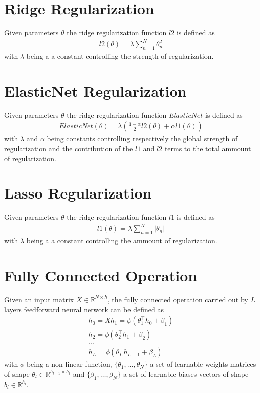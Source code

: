 \section{Ridge Regularization}
Given parameters $\theta$ the ridge regularization function $l2$ is defined as 
\begin{gather}
    \label{ridge}
    l2(\theta) = \lambda \sum_{n=1}^{N}\theta_n^2
\end{gather}
with $\lambda$ being a a constant controlling the strength of regularization.

\section{ElasticNet Regularization}
Given parameters $\theta$ the ridge regularization function $ElasticNet$ is defined as 
\begin{gather}
    \label{enet_reg}
    ElasticNet(\theta) = \lambda (\frac{1 - \alpha}{2}l2(\theta) + \alpha l1(\theta))
\end{gather}
with $\lambda$ and $\alpha$ being constants controlling respectively the global strength of regularization and the contribution of the $l1$ and $l2$ terms to the total ammount of regularization.

\section{Lasso Regularization}
Given parameters $\theta$ the ridge regularization function $l1$ is defined as 
\begin{gather}
    \label{lasso}
    l1(\theta) = \lambda \sum_{n=1}^{N}|\theta_n|
\end{gather}
with $\lambda$ being a a constant controlling the ammount of regularization.

\section{Fully Connected Operation}
Given an input matrix $X \in \mathbb{R}^{N \times h}$, the fully connected operation carried out by $L$ layers feedforward neural network can be defined as
\begin{gather}
    \label{fnn_operation}
    h_0 = X
    h_1 = \phi(\theta_1^\top h_0 + \beta_1)\\ \nonumber
    h_2 = \phi(\theta_2^\top h_1  + \beta_2)\\ \nonumber
    \dots\\ \nonumber
    h_L = \phi(\theta_L^\top h_{L-1}  + \beta_L) \nonumber
\end{gather}
with $\phi$ being a non-linear function, $\{\theta_1, \dots, \theta_N\}$ a set of learnable weights matrices of shape $\theta_l \in \mathbb{R}^{h_{l-1} \times h_{l}}$ and $\{\beta_1, \dots, \beta_N\}$ a set of learnable biases vectors of shape $b_l \in \mathbb{R}^{h_l}$.

